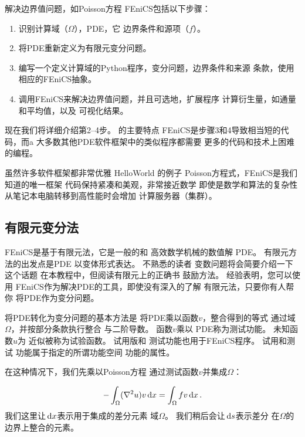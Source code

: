 解决边界值问题，如Poisson方程
FEniCS包括以下步骤：

\begin{enumerate}
\item 识别计算域（$\Omega$），PDE，它 边界条件和源项（$f$）。
\item 将PDE重新定义为有限元变分问题。
\item 编写一个定义计算域的Python程序，变分问题，边界条件和来源
  条款，使用相应的FEniCS抽象。
\item 调用FEniCS来解决边界值问题，并且可选地，扩展程序
计算衍生量，如通量和平均值，以及 可视化结果。
\end{enumerate}

\noindent
现在我们将详细介绍第2--4步。 的主要特点
FEniCS是步骤3和4导致相当短的代码，而a
大多数其他PDE软件框架中的类似程序都需要
更多的代码和技术上困难的编程。

\begin{notice}[什么使FEniCS有吸引力？]
虽然许多软件框架都非常优雅
HelloWorld 的例子
Poisson方程式，FEniCS是我们知道的唯一框架
代码保持紧凑和美观，非常接近数学
即使是数学和算法的复杂性
从笔记本电脑转移到高性能时会增加
计算服务器（集群）。
\end{notice}

\subsection{有限元变分法}
\label{ch:poisson0:varform}

FEniCS是基于有限元法，它是一般的和
高效数学机械的数值解
PDE。 有限元方法的出发点是PDE
以变体形式表达。 不熟悉的读者
变数问题将会简要介绍一下这个话题
在本教程中，但阅读有限元上的正确书
鼓励方法。 经验表明，您可以使用
FEniCS作为解决PDE的工具，即使没有深入的了解
有限元法，只要你有人帮你
将PDE作为变分问题。


将PDE转化为变分问题的基本方法是
将PDE乘以函数$v$，整合得到的等式
通过域$\Omega$，并按部分条款执行整合
与二阶导数。 函数$v$乘以
PDE称为测试功能。 未知函数$u$为
近似被称为试验函数。 试用版和
测试功能也用于FEniCS程序。 试用和测试
功能属于指定的所谓功能空间
功能的属性。


在这种情况下，我们先乘以Poisson方程
通过测试函数$v$并集成$\Omega$：

\begin{equation}
\label{ch:poisson0:multbyv}
-\int_\Omega (\nabla^2 u)v \dx = \int_\Omega fv \dx\tp
\end{equation}
我们这里让$\dx$表示用于集成的差分元素
域$\Omega$。 我们稍后会让$\ds$表示差分
在$\Omega$的边界上整合的元素。

